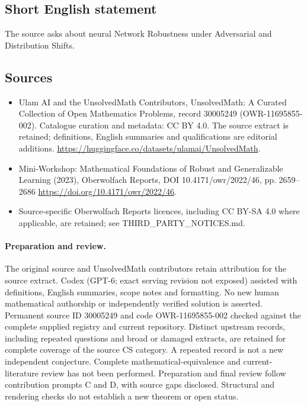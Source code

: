 \documentclass[11pt]{article}
\begin{document}
\subsection{Short English statement}
The source asks about neural Network Robustness under Adversarial and Distribution Shifts.
\subsection{Sources}
\begin{itemize}
\item[\hypertarget{source:30005249:1}{S1}] Ulam AI and the UnsolvedMath Contributors, UnsolvedMath: A Curated Collection of Open Mathematics Problems, record 30005249 (OWR-11695855-002). Catalogue curation and metadata: CC BY 4.0. The source extract is retained; definitions, English summaries and qualifications are editorial additions.
\url{https://huggingface.co/datasets/ulamai/UnsolvedMath}.
\item[\hypertarget{source:30005249:2}{S2}] Mini-Workshop: Mathematical Foundations of Robust and Generalizable Learning (2023), Oberwolfach Reports, DOI 10.4171/owr/2022/46, pp. 2659--2686
\url{https://doi.org/10.4171/owr/2022/46}.
\item Source-specific Oberwolfach Reports licences, including CC BY-SA 4.0 where applicable, are retained; see THIRD\_PARTY\_NOTICES.md.
\end{itemize}
\paragraph{Preparation and review.}
The original source and UnsolvedMath contributors retain attribution for the source extract. Codex (GPT-6; exact serving revision not exposed) assisted with definitions, English summaries, scope notes and formatting. No new human mathematical authorship or independently verified solution is asserted. Permanent source ID 30005249 and code OWR-11695855-002 checked against the complete supplied registry and current repository. Distinct upstream records, including repeated questions and broad or damaged extracts, are retained for complete coverage of the source CS category. A repeated record is not a new independent conjecture. Complete mathematical-equivalence and current-literature review has not been performed. Preparation and final review follow contribution prompts C and D, with source gaps disclosed. Structural and rendering checks do not establish a new theorem or open status.
\label{end:30005249}
\end{document}
